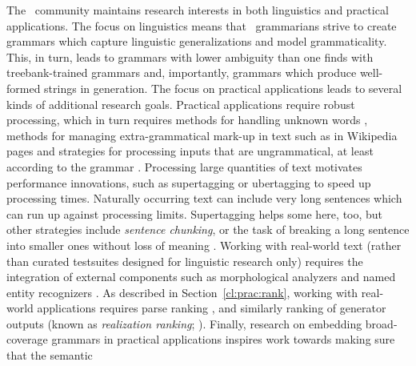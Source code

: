 \documentclass[output=paper,nonflat]{langsci/langscibook}
\begin{document}
The \delphin\ community maintains research interests in both
linguistics and practical applications. The focus on linguistics means
that \delphin\ grammarians strive to create grammars which capture
linguistic generalizations and model grammaticality. This, in turn,
leads to grammars with lower ambiguity than one finds with
treebank-trained grammars and, importantly, grammars which produce
well-formed strings in generation. The focus on practical applications
leads to several kinds of additional research goals. Practical applications
require robust processing, which in turn requires methods for handling 
unknown words
\citep[\eg][]{chartmapping}, methods for managing extra-grammatical mark-up in
text such as in Wikipedia pages \citep[\eg][]{FOY2010a-u} and strategies
for processing inputs that are ungrammatical, at least according to
the grammar \citep[\eg][see also Section~\ref{cl:downstream:data}]{W11-2923}.
Processing large quantities of text motivates performance innovations, such as supertagging or ubertagging \citep[\eg][see also Section~\ref{cl:prac:rank}]{matsuzaki2007supertag,dridan2013ubertag} to speed
up processing times. Naturally occurring text can include very long 
sentences which can run up against processing limits. Supertagging helps some here, too, but other strategies include \textit{sentence chunking}, or the task of breaking a long sentence into smaller ones without loss of meaning \cite{muszynska:2016:ACL-SRW}.
Working with real-world text (rather than curated testsuites designed
for linguistic research only) requires 
the integration of external components such as morphological
analyzers \citep[\eg][]{Marimon2013a-u} and named entity recognizers \cite[\eg][]{L06-1115,Sch:Usz:Fed:08}. As described in Section~\ref{cl:prac:rank}, working with real-world applications requires parse ranking \citep[\eg][]{Tou:Man:Fli:Oep:05}, and similarly ranking of generator outputs (known as \textit{realization ranking}; \citealt[\eg][]{Velldal:09}). Finally, research on embedding broad-coverage grammars in practical applications inspires work  towards making sure that the semantic
\end{document}
